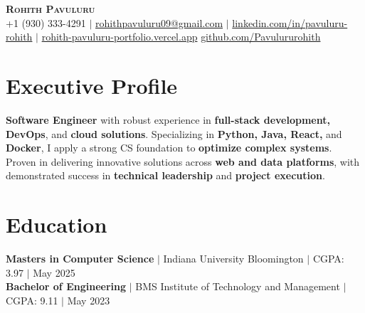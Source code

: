 \documentclass[letterpaper,10pt]{article}
\begin{document}
\begin{center}
    \textbf{\huge \scshape Rohith Pavuluru} \\ \vspace{1pt}
    \small{+1 (930) 333-4291} $|$ \href{mailto:rohithpavuluru09@gmail.com}{rohithpavuluru09@gmail.com} $|$
    \href{https://linkedin.com/in/pavuluru-rohith}{linkedin.com/in/pavuluru-rohith} $|$ \href{https://rohith-pavuluru-portfolio.vercel.app}{rohith-pavuluru-portfolio.vercel.app} 
    \href{https://github.com/Pavulururohith}{github.com/Pavulururohith}
\end{center}
\vspace{-22.5pt}

\section{Executive Profile}
    \small{\textbf{Software Engineer} with robust experience in \textbf{full-stack development, DevOps}, and \textbf{cloud solutions}. Specializing in \textbf{Python, Java, React,} and \textbf{Docker}, I apply a strong CS foundation to \textbf{optimize complex systems}. Proven in delivering innovative solutions across \textbf{web and data platforms}, with demonstrated success in \textbf{technical leadership} and \textbf{project execution}.}
\vspace{-0.4cm}

\section{Education}
\small{\textbf{Masters in Computer Science} $|$ Indiana University Bloomington $|$ CGPA: 3.97 $|$ May 2025}\\
\small{\textbf{Bachelor of Engineering} $|$ BMS Institute of Technology and Management $|$ CGPA: 9.11 $|$ May 2023}
\vspace{-12pt}


\end{document}
